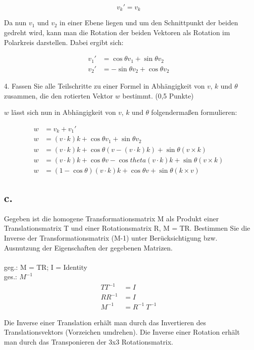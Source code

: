 \documentclass[12pt]{scrreprt}
\begin{document}
\[
	v_k' = v_k
\]

Da nun $v_1$ und $v_2$ in einer Ebene liegen und um den Schnittpunkt der beiden gedreht wird, kann man die Rotation der beiden Vektoren als Rotation im Polarkreis darstellen. Dabei ergibt sich:

\begin{align*}
	v_1' &= \cos{\theta} v_1 + \sin{\theta} v_2\\
	v_2' &= -\sin{\theta} v_2 + \cos{\theta} v_2
\end{align*}

4. Fassen Sie alle Teilschritte zu einer Formel in Abhängigkeit von $v$, $k$ und $\theta$ zusammen, die den
rotierten Vektor $w$ bestimmt. (0,5 Punkte)

$w$ lässt sich nun in Abhängigkeit von $v$, $k$ und $\theta$ folgendermaßen formulieren:

\begin{align*}
	w &= v_k + v_1'\\
	w &= (v \cdot k)k + \cos{\theta} v_1 + \sin{\theta} v_2\\
	w &= (v \cdot k)k + \cos{\theta} (v - (v \cdot k)k) + \sin{\theta} (v \times k)\\
	w &= (v \cdot k)k + \cos{\theta}v - \cos{theta}(v \cdot k)k + \sin{\theta}(v \times k)\\
	w &= (1 - \cos{\theta})(v \cdot k)k + \cos{\theta}v + \sin{\theta}(k \times v)
\end{align*}

\subsection*{c.}

Gegeben ist die homogene Transformationsmatrix M als Produkt einer Translationsmatrix T und einer
Rotationsmatrix R, M = TR. Bestimmen Sie die Inverse der Transformationsmatrix (M-1) unter
Berücksichtigung bzw. Ausnutzung der Eigenschaften der gegebenen Matrizen.\\
\\
geg.: M = TR; I = Identity\\
ges.: $M^{-1}$ \\

\begin{align*}
	TT^{-1} &= I \\
	RR^{-1} &= I \\
	M^{-1} &= R^{-1} ~ T^{-1}
\end{align*}

Die Inverse einer Translation erhält man durch das Invertieren des Translationsvektors (Vorzeichen umdrehen).
Die Inverse einer Rotation erhält man durch das Transponieren der 3x3 Rotationsmatrix.
\end{document}
